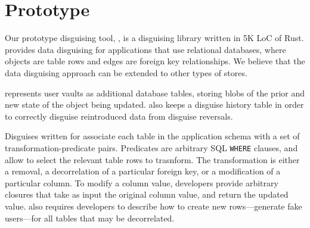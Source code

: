 \section{Prototype}
\label{sec:proto}
%
Our prototype disguising tool, \sys, is a disguising library written in 5K LoC of Rust.
%
\sys provides data disguising for applications that use relational databases, where
objects are table rows and edges are foreign key relationships.
%
We believe that the data disguising approach can be extended to other types of stores.
%

%
\sys represents user vaults as additional database tables, storing blobs of the prior and new state
of the object being updated. \sys also keeps a disguise history table in order to correctly 
disguise reintroduced data from disguise reversals.
%

%
Disguises written for \sys associate each table in the application schema with a set of
transformation-predicate pairs. Predicates are arbitrary SQL \texttt{WHERE} clauses, and allow \sys
to select the relevant table rows to trasnform. The
transformation is either a removal, a decorrelation of a particular foreign key, or a
modification of a particular column. To modify a column value, developers provide arbitrary closures that take as input the original column value, and return the updated value.
%
\sys also requires developers to describe how to create new rows---\eg generate fake users---for all
tables that may be decorrelated.

\iffalse
\sys also provides a specification of the end-state after it applies a sequence of
disguises; this allows developers to double-check that their disguises achieve their privacy
transformation goals.
%
To do so, \sys automatically generates a sequence of materialized view filters that, when applied on top of each
other, correspond to the state achieved by composing the disguises. 
Developers specify assertions (\eg all objects belonging to departing user Bob have
been removed) that \sys ensures holds on the materialized view specification.

\sys's composition technique may reorder filters from one disguise with those from a subsequent disguise in order to achieve the
correct result.
%
\sys maps these filters directly to physical database operations (where reordering filters corresponds to
temporarily undoing vault entries). Thus, the developer can use the materialized view filters as a way to
test the correctness of \sys and their disguises prior to permanently altering the application database. 
\fi

